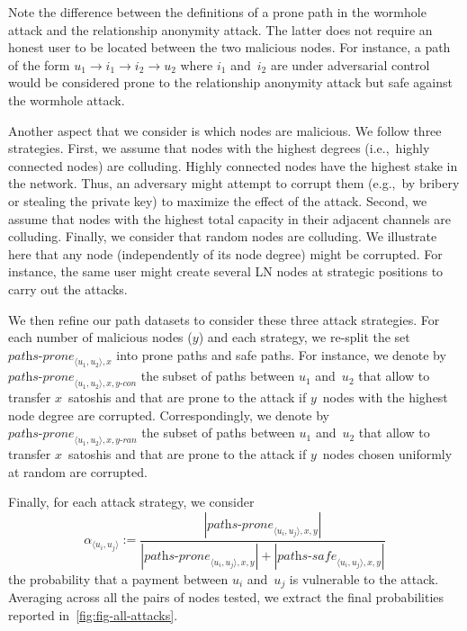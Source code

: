 Note the difference between the definitions of a prone path in the wormhole attack and the relationship anonymity attack.
The latter does not require an honest user to be located between the two malicious nodes.
For instance, a path of the form $u_1 \rightarrow i_1 \rightarrow i_2 \rightarrow u_2$ where $i_1$ and~$i_2$ are under adversarial control would be considered prone to the relationship anonymity attack but safe against the wormhole attack.

Another aspect that we consider is which nodes are malicious.
We follow three strategies.
First, we assume that nodes with the highest degrees (i.e.,~highly connected nodes) are colluding.
Highly connected nodes have the highest stake in the network.
Thus, an adversary might attempt to corrupt them (e.g.,~by bribery or stealing the private key) to maximize the effect of the attack.
Second, we assume that nodes with the highest total capacity in their adjacent channels are colluding.
Finally, we consider that random nodes are colluding.
We illustrate here that any node (independently of its node degree) might be corrupted.
For instance, the same user might create several LN nodes at strategic positions to carry out the attacks.

We then refine our path datasets to consider these three attack strategies.
For each number of malicious nodes ($y$) and each strategy, we re-split the set $\textit{paths-prone}_{\langle u_1, u_2 \rangle, x}$ into prone paths and safe paths.
For instance, we denote by $\textit{paths-prone}_{\langle u_1, u_2 \rangle, x, y\textit{-con}}$ the subset of paths between $u_1$ and~$u_2$ that allow to transfer $x$~satoshis and that are prone to the attack if $y$~nodes with the highest node degree are corrupted.
Correspondingly, we denote by $\textit{paths-prone}_{\langle u_1, u_2 \rangle, x, y\textit{-ran}}$ the subset of paths between $u_1$ and~$u_2$ that allow to transfer $x$~satoshis and that are prone to the attack if $y$~nodes chosen uniformly at random are corrupted.

Finally, for each attack strategy, we consider $$\alpha_{\langle u_i, u_j \rangle} := \frac{|\textit{paths-prone}_{\langle u_i, u_j \rangle, x, y}|}{|\textit{paths-prone}_{\langle u_i, u_j \rangle, x, y}| + |\textit{paths-safe}_{\langle u_i, u_j \rangle, x, y}|}$$ the probability that a payment between $u_i$ and~$u_j$ is vulnerable to the attack.
Averaging across all the pairs of nodes tested, we extract the final probabilities reported in~\cref{fig:fig-all-attacks}.

